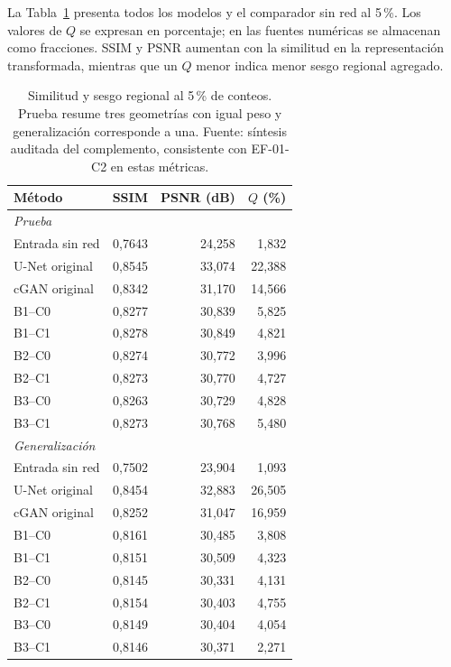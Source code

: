 La Tabla~\ref{tab:res-f05} presenta todos los modelos y el comparador sin red al 5\,\%. Los valores de $Q$ se expresan en porcentaje; en las fuentes numéricas se almacenan como fracciones. SSIM y PSNR aumentan con la similitud en la representación transformada, mientras que un $Q$ menor indica menor sesgo regional agregado.
\begin{table}[htbp]\centering\small
\caption[Evaluación de todos los modelos al 5\,\%]{Similitud y sesgo regional al 5\,\% de conteos. Prueba resume tres geometrías con igual peso y generalización corresponde a una. Fuente: síntesis auditada del complemento, consistente con EF-01-C2 en estas métricas.}\label{tab:res-f05}
\begin{tabular}{@{}lrrr@{}}\toprule
Método & SSIM & PSNR (dB) & $Q$ (\%)\\\midrule
\multicolumn{4}{l}{\textit{Prueba}}\\
Entrada sin red & 0{,}7643 & 24{,}258 & 1{,}832\\
U-Net original & 0{,}8545 & 33{,}074 & 22{,}388\\
cGAN original & 0{,}8342 & 31{,}170 & 14{,}566\\
B1--C0 & 0{,}8277 & 30{,}839 & 5{,}825\\
B1--C1 & 0{,}8278 & 30{,}849 & 4{,}821\\
B2--C0 & 0{,}8274 & 30{,}772 & 3{,}996\\
B2--C1 & 0{,}8273 & 30{,}770 & 4{,}727\\
B3--C0 & 0{,}8263 & 30{,}729 & 4{,}828\\
B3--C1 & 0{,}8273 & 30{,}768 & 5{,}480\\
\midrule
\multicolumn{4}{l}{\textit{Generalización}}\\
Entrada sin red & 0{,}7502 & 23{,}904 & 1{,}093\\
U-Net original & 0{,}8454 & 32{,}883 & 26{,}505\\
cGAN original & 0{,}8252 & 31{,}047 & 16{,}959\\
B1--C0 & 0{,}8161 & 30{,}485 & 3{,}808\\
B1--C1 & 0{,}8151 & 30{,}509 & 4{,}323\\
B2--C0 & 0{,}8145 & 30{,}331 & 4{,}131\\
B2--C1 & 0{,}8154 & 30{,}403 & 4{,}755\\
B3--C0 & 0{,}8149 & 30{,}404 & 4{,}054\\
B3--C1 & 0{,}8146 & 30{,}371 & 2{,}271\\
\bottomrule\end{tabular}\end{table}

